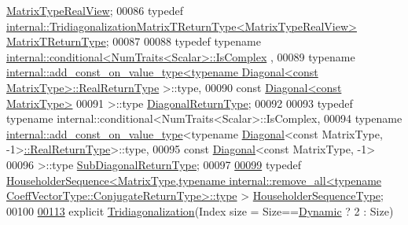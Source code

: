 \begin{DoxyCode}
       \hyperlink{group___sparse_core___module}{MatrixTypeRealView};
00086     \textcolor{keyword}{typedef} \hyperlink{struct_eigen_1_1internal_1_1_tridiagonalization_matrix_t_return_type}{internal::TridiagonalizationMatrixTReturnType<MatrixTypeRealView>}
       \hyperlink{struct_eigen_1_1internal_1_1_tridiagonalization_matrix_t_return_type}{MatrixTReturnType};
00087 
00088     \textcolor{keyword}{typedef} \textcolor{keyword}{typename} \hyperlink{struct_eigen_1_1internal_1_1conditional}{internal::conditional<NumTraits<Scalar>::IsComplex}
      ,
00089               \textcolor{keyword}{typename} 
      \hyperlink{struct_eigen_1_1internal_1_1add__const__on__value__type}{internal::add\_const\_on\_value\_type<typename Diagonal<const MatrixType>::RealReturnType}
      >::type,
00090               \textcolor{keyword}{const} \hyperlink{group___core___module_class_eigen_1_1_diagonal}{Diagonal<const MatrixType>}
00091             >::type \hyperlink{class_eigen_1_1internal_1_1_tensor_lazy_evaluator_writable}{DiagonalReturnType};
00092 
00093     \textcolor{keyword}{typedef} \textcolor{keyword}{typename} internal::conditional<NumTraits<Scalar>::IsComplex,
00094               \textcolor{keyword}{typename} \hyperlink{struct_eigen_1_1internal_1_1add__const__on__value__type}{internal::add\_const\_on\_value\_type}<\textcolor{keyword}{typename} 
      \hyperlink{group___core___module_class_eigen_1_1_diagonal}{Diagonal}<\textcolor{keyword}{const} MatrixType, -1>\hyperlink{class_eigen_1_1internal_1_1_tensor_lazy_evaluator_writable}{::RealReturnType}>::type,
00095               \textcolor{keyword}{const} \hyperlink{group___core___module_class_eigen_1_1_diagonal}{Diagonal}<\textcolor{keyword}{const} MatrixType, -1>
00096             >::type \hyperlink{class_eigen_1_1internal_1_1_tensor_lazy_evaluator_writable}{SubDiagonalReturnType};
00097 
\hyperlink{group___eigenvalues___module_af322315c8bea9990152c9d09bfa2a69f}{00099}     \textcolor{keyword}{typedef} 
      \hyperlink{group___householder___module_class_eigen_1_1_householder_sequence}{HouseholderSequence<MatrixType,typename internal::remove\_all<typename
       CoeffVectorType::ConjugateReturnType>::type}
      > \hyperlink{group___eigenvalues___module_af322315c8bea9990152c9d09bfa2a69f}{HouseholderSequenceType};
00100 
\hyperlink{group___eigenvalues___module_a9ea2e6154bf35494ee68e037f0867cbd}{00113}     \textcolor{keyword}{explicit} \hyperlink{group___eigenvalues___module_a9ea2e6154bf35494ee68e037f0867cbd}{Tridiagonalization}(Index size = Size==\hyperlink{namespace_eigen_ad81fa7195215a0ce30017dfac309f0b2}{Dynamic} ? 2 : Size)

\end{DoxyCode}
